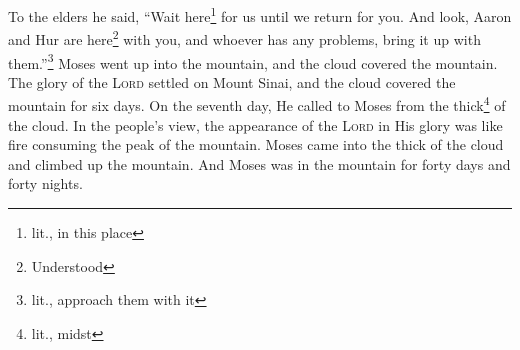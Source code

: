 \begin{enumerate}[align=center]
     To the elders he said, ``Wait here\footnote{lit., in this place} for us until we return for you. And look, Aaron and Hur are here\footnote{Understood} with you, and whoever has any problems, bring it up with them.''\footnote{lit., approach them with it}%
     Moses went up into the mountain, and the cloud covered the mountain.%
     The glory of the \textsc{Lord} settled on Mount Sinai, and the cloud covered the mountain for six days. On the seventh day, He called to Moses from the thick\footnote{lit., midst} of the cloud.%
     In the people's view, the appearance of the \textsc{Lord} in His glory was like fire consuming the peak of the mountain.%
     Moses came into the thick of the cloud and climbed up the mountain. And Moses was in the mountain for forty days and forty nights.%
\end{enumerate}
